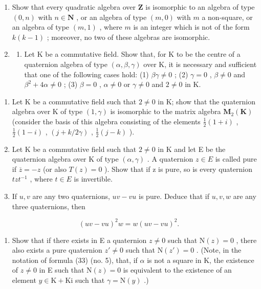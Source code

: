 \begin{enumerate}
\def\labelenumi{\arabic{enumi}.}
\setcounter{enumi}{1}
\item
  Show that every quadratic algebra over \(\mathbf{Z}\) is isomorphic to an algebra of type \((0, n)\) with \(n \in \mathbf{N}\) , or an algebra of type \((m, 0)\) with \(m\) a non-square, or an algebra of type \((m, 1)\) , where \(m\) is an integer which is not of the form \(k(k - 1)\) ; moreover, no two of these algebras are isomorphic.
\item
  \begin{enumerate}
  \def\labelenumii{(\alph{enumii})}
  \tightlist
  \item
    Let K be a commutative field. Show that, for K to be the centre of a quaternion algebra of type \((\alpha, \beta, \gamma)\) over K, it is necessary and sufficient that one of the following cases hold: (1) \(\beta\gamma \neq 0\) ; (2) \(\gamma = 0\) , \(\beta \neq 0\) and \(\beta^{2} + 4\alpha \neq 0\) ; (3) \(\beta = 0\) , \(\alpha \neq 0\) or \(\gamma \neq 0\) and \(2 \neq 0\) in K.
  \end{enumerate}
\end{enumerate}

\begin{enumerate}
\def\labelenumi{(\alph{enumi})}
\setcounter{enumi}{1}
\item
  Let K be a commutative field such that \(2 \neq 0\) in K; show that the quaternion algebra over K of type \((1, \gamma)\) is isomorphic to the matrix algebra \(\mathbf{M}_{2}(\mathbf{K})\) (consider the basis of this algebra consisting of the elements \(\frac{1}{2}(1 + i)\) , \(\frac{1}{2}(1 - i)\) , \((j + k/2\gamma)\) , \(\frac{1}{2}(j - k)\) ).
\item
  Let K be a commutative field such that \(2 \neq 0\) in K and let E be the quaternion algebra over K of type \((\alpha, \gamma)\) . A quaternion \(z \in E\) is called pure if \(\overline{z} = -z\) (or also \(T(z) = 0\) ). Show that if z is pure, so is every quaternion \(tzt^{-1}\) , where \(t \in E\) is invertible.
\item
  If \(u, v\) are any two quaternions, \(uv - vu\) is pure. Deduce that if \(u, v, w\) are any three quaternions, then
\end{enumerate}

\[
(u v - v u) ^ {2} w = w (u v - v u) ^ {2}.
\]

\begin{enumerate}
\def\labelenumi{(\alph{enumi})}
\setcounter{enumi}{4}
\tightlist
\item
  Show that if there exists in E a quaternion \(z \neq 0\) such that \(\mathrm{N}(z) = 0\) , there also exists a pure quaternion \(z' \neq 0\) such that \(\mathrm{N}(z') = 0\) . (Note, in the notation of formula (33) (no. 5), that, if \(\alpha\) is not a square in K, the existence of \(z \neq 0\) in E such that \(\mathrm{N}(z) = 0\) is equivalent to the existence of an element \(y \in \mathrm{K} + \mathrm{Ki}\) such that \(\gamma = \mathrm{N}(y)\) .)
\end{enumerate}

